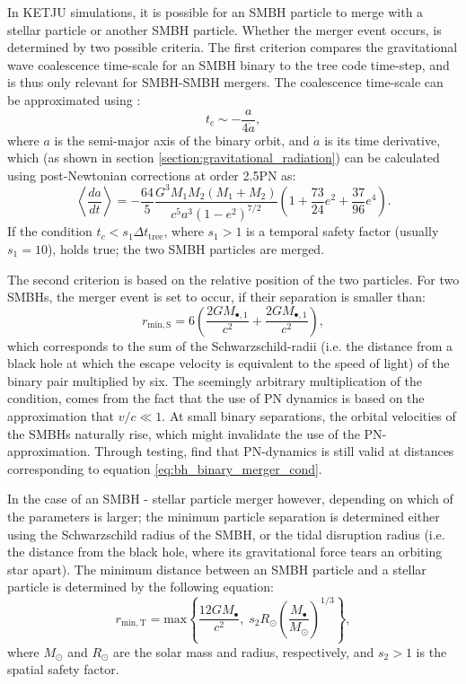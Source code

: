 \documentclass[english, twoside]{HYgradu}
\begin{document}
In KETJU simulations, it is possible for an SMBH particle to merge with a stellar particle or another SMBH particle. Whether the merger event occurs, is determined by two possible criteria. The first criterion compares the gravitational wave coalescence time-scale for an SMBH binary to the tree code time-step, and is thus only relevant for SMBH-SMBH mergers. The coalescence time-scale can be approximated using \citep{Rantala2017KETJU}:
\begin{equation}
t_c \sim -\frac{a}{4\dot{a}},
\end{equation}
where $a$ is the semi-major axis of the binary orbit, and $\dot{a}$ is its time derivative, which (as shown in section \ref{section:gravitational_radiation}) can be calculated using post-Newtonian corrections at order 2.5PN as:
\begin{equation}
\left\langle \frac{da}{dt} \right\rangle = -\frac{64}{5}\frac{G^3M_1M_2(M_1+M_2)}{c^5a^3(1-e^2)^{7/2}} \left( 1+\frac{73}{24}e^2+\frac{37}{96}e^4 \right).
\end{equation}
If the condition $t_c < s_1 \Delta t_\mathrm{tree}$, where $s_1 > 1$ is a temporal safety factor (usually $s_1 = 10$), holds true; the two SMBH particles are merged.

The second criterion is based on the relative position of the two particles. For two SMBHs, the merger event is set to occur, if their separation is smaller than: 
\begin{equation}
r_\mathrm{min,S} = 6\left( \frac{2GM_{\bullet,1}}{c^2} + \frac{2GM_{\bullet,1}}{c^2} \right), \label{eq:bh_binary_merger_cond}
\end{equation}
which corresponds to the sum of the Schwarzschild-radii (i.e. the distance from a black hole at which the escape velocity is equivalent to the speed of light) of the binary pair multiplied by six. The seemingly arbitrary multiplication of the condition, comes from the fact that the use of PN dynamics is based on the approximation that $v/c \ll 1$. At small binary separations, the orbital velocities of the SMBHs naturally rise, which might invalidate the use of the PN-approximation. Through testing, \cite{Rantala2017KETJU} find that PN-dynamics is still valid at distances corresponding to equation \ref{eq:bh_binary_merger_cond}. 

In the case of an SMBH - stellar particle merger however, depending on which of the parameters is larger; the minimum particle separation is determined either using the Schwarzschild radius of the SMBH, or the tidal disruption radius (i.e. the distance from the black hole, where its gravitational force tears an orbiting star apart). The minimum distance between an SMBH particle and a stellar particle is determined by the following equation:
\begin{equation}
r_\mathrm{min,T} = \mathrm{max} \left\lbrace \frac{12GM_{\bullet}}{c^2}, \; s_2 R_\odot \left( \frac{M_\bullet}{M_\odot} \right)^{1/3} \right\rbrace,
\end{equation}
where $M_\odot$ and $R_\odot$ are the solar mass and radius, respectively, and $s_2 > 1$ is the spatial safety factor. 
\end{document}
